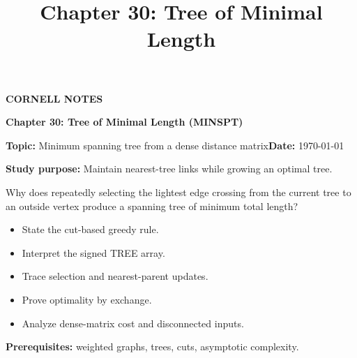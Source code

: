 \documentclass[10pt,letterpaper]{article}
\title{Chapter 30: Tree of Minimal Length}
\author{}
\date{}
\begin{document}
\maketitle
\begin{tcolorbox}[colback=Paper,colframe=Ink]{\small\bfseries\color{Teal}CORNELL NOTES}\par{\LARGE\bfseries Chapter 30: Tree of Minimal Length (MINSPT)}\par\medskip\textbf{Topic:} Minimum spanning tree from a dense distance matrix\hfill\textbf{Date:} \today\par\textbf{Study purpose:} Maintain nearest-tree links while growing an optimal tree.\end{tcolorbox}
\begin{tcolorbox}[colback=Teal!5,colframe=Teal,title=Essential question]Why does repeatedly selecting the lightest edge crossing from the current tree to an outside vertex produce a spanning tree of minimum total length?\end{tcolorbox}
\begin{tcolorbox}[colback=white,colframe=Mist,title=Learning objectives]\begin{itemize}\item State the cut-based greedy rule.\item Interpret the signed TREE array.\item Trace selection and nearest-parent updates.\item Prove optimality by exchange.\item Analyze dense-matrix cost and disconnected inputs.\end{itemize}\textbf{Prerequisites:} weighted graphs, trees, cuts, asymptotic complexity.\end{tcolorbox}
\end{document}
